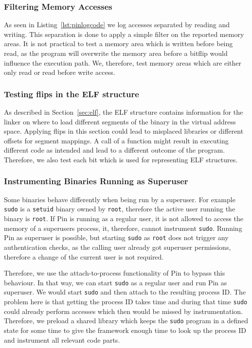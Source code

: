 \subsubsection{Filtering Memory Accesses}

As seen in Listing~\ref{lst:pinlogcode} we log accesses separated by reading and
writing. This separation is done to apply a simple filter on the reported memory
areas. It is not practical to test a memory area which is written before being
read, as the program will overwrite the memory area before a bitflip would
influence the execution path. We, therefore, test memory areas which are either
only read or read before write access.

\subsubsection{Testing flips in the ELF structure}

As described in Section~\ref{sec:elf}, the ELF structure contains information
for the linker on where to load different segments of the binary in the virtual
address space. Applying flips in this section could lead to misplaced libraries
or different offsets for segment mappings. A call of a function might result in
executing different code as intended and lead to a different outcome of the
program. Therefore, we also test each bit which is used for representing ELF
structures.

\subsubsection{Instrumenting Binaries Running as Superuser}
\label{sec:setuidfix}

Some binaries behave differently when being run by a superuser. For example
\texttt{sudo} is a \texttt{setuid} binary owned by \texttt{root}, therefore the
active user running the binary is \texttt{root}. If Pin is running as a regular
user, it is not allowed to access the memory of a superuser\textquotesingle s
process, it, therefore, cannot instrument \texttt{sudo}. Running Pin as
superuser is possible, but starting \texttt{sudo} as \texttt{root} does not
trigger any authentication checks, as the calling user already got superuser
permissions, therefore a change of the current user is not required.

Therefore, we use the attach-to-process functionality of Pin to bypass this
behaviour. In that way, we can start \texttt{sudo} as a regular user and run
Pin as superuser. We would start \texttt{sudo} and then attach to the resulting
process ID. The problem here is that getting the process ID takes time and
during that time \texttt{sudo} could already perform accesses which then would
be missed by instrumentation. Therefore, we preload a shared library which
keeps the \texttt{sudo} program in a defined state for some time to give the
framework enough time to look up the process ID and instrument all relevant
code parts.

